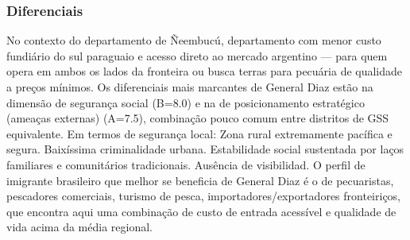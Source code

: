 \subsubsection*{Diferenciais}\label{dif-general-diaz-1205}
No contexto do departamento de Ñeembucú, departamento com menor custo fundiário do sul paraguaio e acesso direto ao mercado argentino — para quem opera em ambos os lados da fronteira ou busca terras para pecuária de qualidade a preços mínimos. Os diferenciais mais marcantes de General Diaz estão na dimensão de segurança social (B=8.0) e na de posicionamento estratégico (ameaças externas) (A=7.5), combinação pouco comum entre distritos de GSS equivalente. Em termos de segurança local: Zona rural extremamente pacífica e segura. Baixíssima criminalidade urbana. Estabilidade social sustentada por laços familiares e comunitários tradicionais. Ausência de visibilidad. O perfil de imigrante brasileiro que melhor se beneficia de General Diaz é o de pecuaristas, pescadores comerciais, turismo de pesca, importadores/exportadores fronteiriços, que encontra aqui uma combinação de custo de entrada acessível e qualidade de vida acima da média regional.
